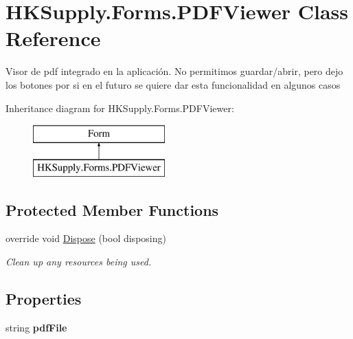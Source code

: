 \hypertarget{class_h_k_supply_1_1_forms_1_1_p_d_f_viewer}{}\section{H\+K\+Supply.\+Forms.\+P\+D\+F\+Viewer Class Reference}
\label{class_h_k_supply_1_1_forms_1_1_p_d_f_viewer}


Visor de pdf integrado en la aplicación. No permitimos guardar/abrir, pero dejo los botones por si en el futuro se quiere dar esta funcionalidad en algunos casos  


Inheritance diagram for H\+K\+Supply.\+Forms.\+P\+D\+F\+Viewer\+:\begin{figure}[H]
\begin{center}
\leavevmode
\includegraphics[height=2.000000cm]{class_h_k_supply_1_1_forms_1_1_p_d_f_viewer}
\end{center}
\end{figure}
\subsection*{Protected Member Functions}
\begin{DoxyCompactItemize}
\item 
override void \mbox{\hyperlink{class_h_k_supply_1_1_forms_1_1_p_d_f_viewer_ad9b7bf418e85b167b39f97a319e1d561}{Dispose}} (bool disposing)
\begin{DoxyCompactList}\small\item\em Clean up any resources being used. \end{DoxyCompactList}\end{DoxyCompactItemize}
\subsection*{Properties}
\begin{DoxyCompactItemize}
\item 
\mbox{\label{class_h_k_supply_1_1_forms_1_1_p_d_f_viewer_aa2e435c21c56568602d56d22befbfb8d}} 
string {\bfseries pdf\+File}
\end{DoxyCompactItemize}



